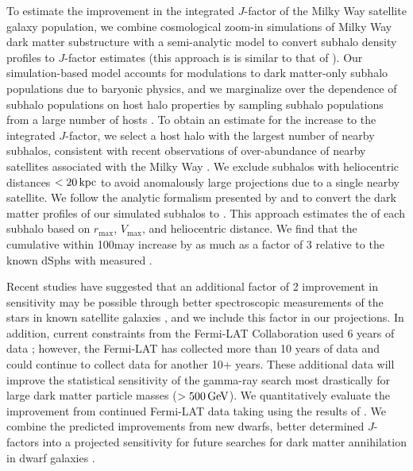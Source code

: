 To estimate the improvement in the integrated $J$-factor of the Milky Way satellite galaxy population, we combine cosmological zoom-in simulations of Milky Way dark matter substructure with a semi-analytic model to convert subhalo density profiles to $J$-factor estimates (this approach is is similar to that of \citealt{1309.4780}). 
Our simulation-based model accounts for modulations to dark matter-only subhalo populations due to baryonic physics, and we marginalize over the dependence of subhalo populations on host halo properties by sampling subhalo populations from a large number of hosts \citep{Nadler:2018}. 
To obtain an estimate for the increase to the integrated $J$-factor, we select a host halo with the largest number of nearby subhalos, consistent with recent observations of over-abundance of nearby satellites associated with the Milky Way \citep{Kim:2018, Graus:2018}. 
We exclude subhalos with heliocentric distances $< 20 \mathrm{\,kpc}$ to avoid anomalously large projections due to a single nearby satellite.
We follow the analytic formalism presented by \citet{1604.05599} and \citet{1802.06811} to convert the dark matter profiles of our simulated subhalos to \Jfactors.  
This approach estimates the \Jfactor of each subhalo based on $r_{\max}$, $V_{\max}$, and heliocentric distance. 
We find that the cumulative \Jfactor within 100\kpc may increase by as much as a factor of 3 relative to the known dSphs with measured \Jfactors. 

Recent studies have suggested that an additional factor of 2 improvement in sensitivity may be possible through better spectroscopic measurements  of the stars in known satellite galaxies \citep{Albert:2017}, and we include this factor in our projections.
In addition, current constraints from the Fermi-LAT Collaboration used 6 years of data \citep{Ackermann:2015}; however, the Fermi-LAT has collected more than 10 years of data and could continue to collect data for another 10+ years.
These additional data will improve the statistical sensitivity of the gamma-ray search most drastically for large dark matter particle masses ($>500\mathrm{\,GeV}$).
We quantitatively evaluate the improvement from continued Fermi-LAT data taking using the results of \citep{Charles:2016}.
We combine the predicted improvements from new dwarfs, better determined $J$-factors into a projected sensitivity for future searches for dark matter annihilation in dwarf galaxies .



